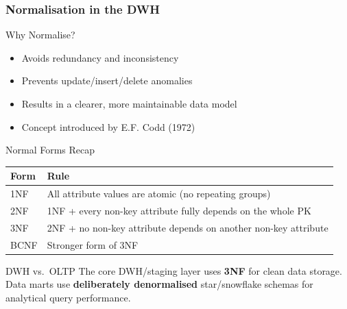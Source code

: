 \begin{frame}
  \frametitle{Normalisation in the DWH}

  \begin{block}{Why Normalise?}
    \begin{itemize}
      \item Avoids redundancy and inconsistency
      \item Prevents update/insert/delete anomalies
      \item Results in a clearer, more maintainable data model
      \item Concept introduced by E.F. Codd (1972)
    \end{itemize}
  \end{block}

  \begin{block}{Normal Forms Recap}
    \begin{tabularx}{\linewidth}{@{}l X@{}}
      \toprule
      \textbf{Form} & \textbf{Rule} \\
      \midrule
      1NF & All attribute values are atomic (no repeating groups) \\
      2NF & 1NF + every non-key attribute fully depends on the whole PK \\
      3NF & 2NF + no non-key attribute depends on another non-key attribute \\
      BCNF & Stronger form of 3NF \\
      \bottomrule
    \end{tabularx}
  \end{block}

  \begin{alertblock}{DWH vs.\ OLTP}
    The core DWH/staging layer uses \textbf{3NF} for clean data storage.
    Data marts use \textbf{deliberately denormalised} star/snowflake schemas
    for analytical query performance.
  \end{alertblock}
\end{frame}
